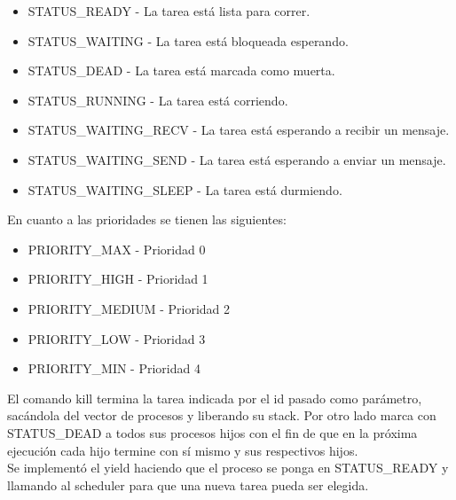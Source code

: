 \documentclass[a4paper,10pt]{article}
\begin{document}
\begin{itemize}
 \item STATUS\_READY - La tarea está lista para correr.
 \item STATUS\_WAITING - La tarea está bloqueada esperando.
 \item STATUS\_DEAD - La tarea está marcada como muerta.
 \item STATUS\_RUNNING - La tarea está corriendo.
 \item STATUS\_WAITING\_RECV - La tarea está esperando a recibir un mensaje.
 \item STATUS\_WAITING\_SEND - La tarea está esperando a enviar un mensaje.
 \item STATUS\_WAITING\_SLEEP - La tarea está durmiendo.
\end{itemize}

En cuanto a las prioridades se tienen las siguientes:

\begin{itemize}
 \item PRIORITY\_MAX - Prioridad 0
 \item PRIORITY\_HIGH - Prioridad 1
 \item PRIORITY\_MEDIUM - Prioridad 2
 \item PRIORITY\_LOW - Prioridad 3
 \item PRIORITY\_MIN - Prioridad 4
\end{itemize}


 

El comando kill termina la tarea indicada por el id pasado como parámetro, sacándola del vector de procesos y 
liberando su stack. Por otro lado marca con STATUS\_DEAD a todos sus procesos hijos 
con el fin de que en la próxima ejecución cada hijo termine con sí mismo y sus
respectivos hijos. \\

Se implementó el yield haciendo que el proceso se ponga en STATUS\_READY y llamando 
al scheduler para que una nueva tarea pueda ser elegida.
\end{document}
